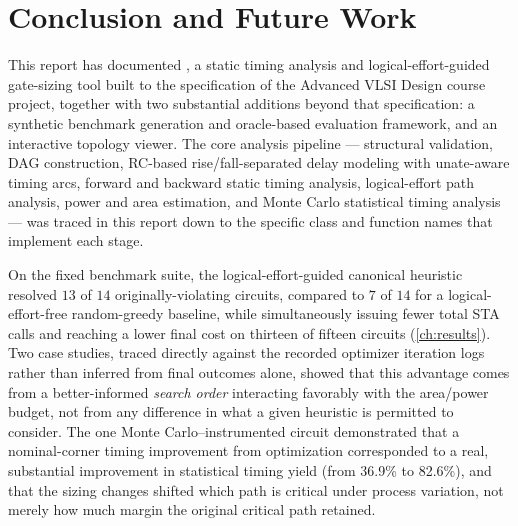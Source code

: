 \chapter{Conclusion and Future Work}
\label{ch:conclusion}

This report has documented \tool, a static timing analysis and
logical-effort-guided gate-sizing tool built to the specification of the
Advanced VLSI Design course project, together with two substantial
additions beyond that specification: a synthetic benchmark generation and
oracle-based evaluation framework, and an interactive topology viewer. The
core analysis pipeline --- structural validation, DAG construction,
RC-based rise/fall-separated delay modeling with unate-aware timing arcs,
forward and backward static timing analysis, logical-effort path analysis,
power and area estimation, and Monte Carlo statistical timing analysis ---
was traced in this report down to the specific class and function names
that implement each stage.

On the fixed benchmark suite, the logical-effort-guided canonical
heuristic resolved $13$ of $14$ originally-violating circuits, compared to
$7$ of $14$ for a logical-effort-free random-greedy baseline, while
simultaneously issuing fewer total STA calls and reaching a lower final
cost on thirteen of fifteen circuits (\cref{ch:results}). Two case studies,
traced directly against the recorded optimizer iteration logs rather than
inferred from final outcomes alone, showed that this advantage comes from
a better-informed \emph{search order} interacting favorably with the
area/power budget, not from any difference in what a given heuristic is
permitted to consider. The one Monte Carlo--instrumented circuit
demonstrated that a nominal-corner timing improvement from optimization
corresponded to a real, substantial improvement in statistical timing
yield (from 36.9\% to 82.6\%), and that the sizing changes shifted which
path is critical under process variation, not merely how much margin the
original critical path retained.
